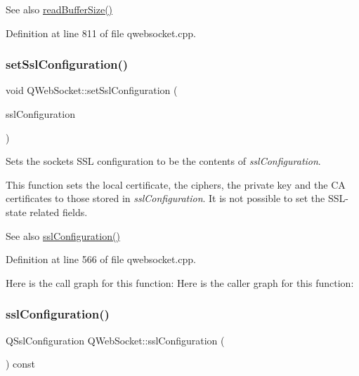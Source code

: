 \begin{DoxySeeAlso}{See also}
\mbox{\hyperlink{class_q_web_socket_a3755970eca2be3d792ceb9c8e560ae32}{read\+Buffer\+Size()}} 
\end{DoxySeeAlso}


Definition at line 811 of file qwebsocket.\+cpp.

\mbox{\label{class_q_web_socket_a2b47402d89258caa95e46452b698cc3a}} 
\subsubsection{\texorpdfstring{set\+Ssl\+Configuration()}{setSslConfiguration()}}
{\footnotesize\ttfamily void Q\+Web\+Socket\+::set\+Ssl\+Configuration (\begin{DoxyParamCaption}\item[{const Q\+Ssl\+Configuration \&}]{ssl\+Configuration }\end{DoxyParamCaption})}

Sets the socket\textquotesingle{}s S\+SL configuration to be the contents of {\itshape ssl\+Configuration}.

This function sets the local certificate, the ciphers, the private key and the CA certificates to those stored in {\itshape ssl\+Configuration}. It is not possible to set the S\+S\+L-\/state related fields. \begin{DoxySeeAlso}{See also}
\mbox{\hyperlink{class_q_web_socket_a002b89e651c50e9b73ec23d07f4f7eba}{ssl\+Configuration()}} 
\end{DoxySeeAlso}


Definition at line 566 of file qwebsocket.\+cpp.

Here is the call graph for this function\+:
Here is the caller graph for this function\+:
\mbox{\label{class_q_web_socket_a002b89e651c50e9b73ec23d07f4f7eba}} 
\subsubsection{\texorpdfstring{ssl\+Configuration()}{sslConfiguration()}}
{\footnotesize\ttfamily Q\+Ssl\+Configuration Q\+Web\+Socket\+::ssl\+Configuration (\begin{DoxyParamCaption}{ }\end{DoxyParamCaption}) const}

